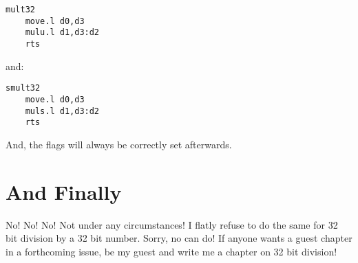 \begin{lstlisting}[caption={MC68020 - unsigned 32bit multiplication},label={lis:MC68020-unsigned-32-bit-multiplication}]
mult32
    move.l d0,d3
    mulu.l d1,d3:d2
    rts
\end{lstlisting}

and:

\begin{lstlisting}[caption={MC68020 - signed 32bit multiplication},label={lis:MC68020-signed-32-bit-multiplication}]
smult32
    move.l d0,d3
    muls.l d1,d3:d2
    rts
\end{lstlisting}

And, the flags will always be correctly set afterwards.

\section{And Finally}

No! No! No! Not under any circumstances! I flatly refuse to do the
same for 32 bit division by a 32 bit number. Sorry, no can do! If
anyone wants a guest chapter in a forthcoming issue, be my guest and
write me a chapter on 32 bit division! 
